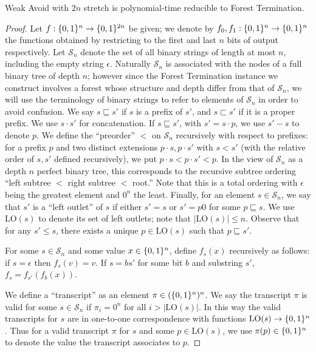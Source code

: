 \begin{lemma}\label{lem:avoid-forest}
{\sc Weak Avoid} with $2n$ stretch is polynomial-time reducible to {\sc Forest Termination}.
\end{lemma}
\begin{proof}
Let $f: \{0,1\}^n \to \{0,1\}^{2n}$ be given; we denote by $f_0,f_1: \{0,1\}^n \to \{0,1\}^n$ the functions obtained by restricting to the first and last $n$ bits of output respectively. Let $\mathcal{S}_n$ denote the set of all binary strings of length at most $n$, including the empty string $\epsilon$. Naturally $\mathcal{S}_n$ is associated with the nodes of a full binary tree of depth $n$; however since the {\sc Forest Termination} instance we construct involves a forest whose structure and depth differ from that of $\mathcal{S}_n$, we will use the terminology of binary strings to refer to elements of $\mathcal{S}_n$ in order to avoid confusion. We say $s \sqsubseteq s'$ if $s$ is a prefix of $s'$, and $s\sqsubset s'$ if it is a proper prefix. We use $s \cdot s'$ for concatenation. If $s \sqsubseteq s'$, with $s' = s \cdot p$, we use $s' - s$ to denote $p$. We define the ``preorder'' $<$ on $\mathcal{S}_n$ recursively with respect to prefixes: for a prefix $p$ and two distinct extensions $p \cdot s, p \cdot s'$ with $s < s'$ (with the relative order of $s,s'$ defined recursively), we put $p \cdot s < p \cdot s' < p$. In the view of $\mathcal{S}_n$ as a depth $n$ perfect binary tree, this corresponds to the recursive subtree ordering ``left subtree $< $ right subtree $< $ root.'' Note that this is a total ordering with $\epsilon$ being the greatest element and $0^n$ the least. Finally, for an element $s \in \mathcal{S}_n$, we say that $s'$ is a ``left outlet'' of $s$ if either $s'=s$ or $s'=p0$ for some $p \sqsubseteq s$. We use $\mathrm{LO}(s)$ to denote its set of left outlets; note that $|\mathrm{LO}(s)| \leq n$. Observe that for any $s' \leq s$, there exists a unique $p \in \mathrm{LO}(s)$ such that $p \sqsubseteq s'$.

For some $s \in \mathcal{S}_n$ and some value $x \in \{0,1\}^n$, define $f_s(x)$ recursively as follows: if $s = \epsilon$ then $f_s(v)=v$. If $s = bs'$ for some bit $b$ and substring $s'$, $f_{s} = f_{s'}(f_b(x))$.

We define a ``transcript'' as an element $\pi \in (\{0,1\}^n)^n$. We say the transcript $\pi$ is valid for some $s \in \mathcal{S}_n$ if $\pi_i = 0^n$ for all $i > |\mathrm{LO}(s)|$. In this way the valid transcripts for $s$ are in one-to-one correspondence with functions $\mathrm{LO}(s) \to \{0,1\}^n$. Thus for a valid transcript $\pi$ for $s$ and some $p \in \mathrm{LO}(s)$, we use $\pi(p) \in \{0,1\}^n$ to denote the value the transcript associates to $p$. 


\end{proof}
